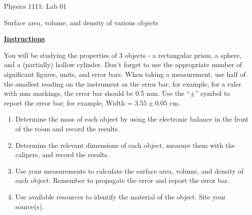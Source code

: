\documentclass[12pt]{article}
\begin{document}
{\centering
\large Physics 1111: Lab 01 \par
\large Surface area, volume, and density of various objects \par
}
\hfill \break \vspace{-4mm}

\underline{\textbf{Instructions}} \par
You will be studying the properties of 3 objects - a rectangular prism, a sphere, and a (partially) hollow cylinder.
Don’t forget to use the appropriate number of significant figures, units, and error bars.
When taking a measurement, use half of the smallest reading on the instrument as the error bar;
for example, for a ruler with mm markings, the error bar should be 0.5 mm.
Use the ``$\pm$'' symbol to report the error bar; for example, Width = $3.55 \pm 0.05$ cm.
\begin{enumerate}
\item Determine the mass of each object by using the electronic balance in the front of the room and record the results.
\item Determine the relevant dimensions of each object, measure them with the calipers, and record the results. 
\item Use your measurements to calculate the surface area, volume, and density of each object. Remember to propagate the error and report the error bar.
\item Use available resources to identify the material of the object. Site your source(s).
\end{enumerate}
\end{document}
